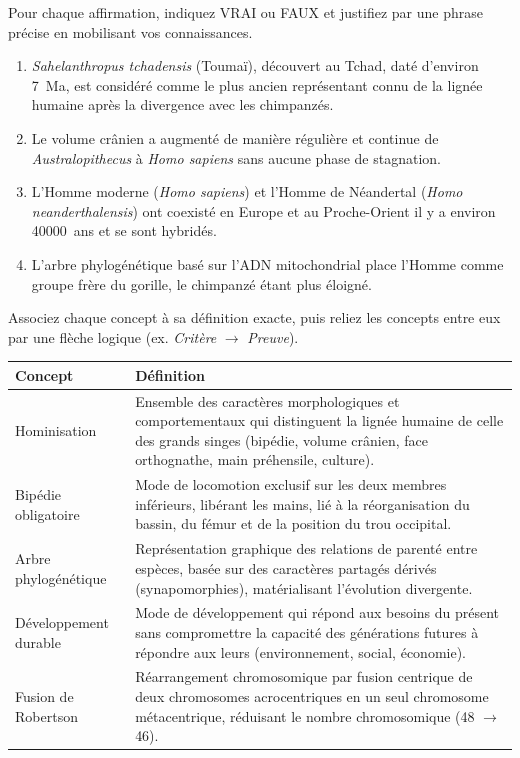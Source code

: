 \documentclass[11pt]{article}
\begin{document}
\begin{exercice}
Pour chaque affirmation, indiquez VRAI ou FAUX et justifiez par une phrase précise en mobilisant vos connaissances.
\begin{enumerate}
    \item \emph{Sahelanthropus tchadensis} (Toumaï), découvert au Tchad, daté d'environ \SI{7}{Ma}, est considéré comme le plus ancien représentant connu de la lignée humaine après la divergence avec les chimpanzés.
    \item Le volume crânien a augmenté de manière régulière et continue de \emph{Australopithecus} à \emph{Homo sapiens} sans aucune phase de stagnation.
    \item L'Homme moderne (\emph{Homo sapiens}) et l'Homme de Néandertal (\emph{Homo neanderthalensis}) ont coexisté en Europe et au Proche-Orient il y a environ \SI{40000}{ans} et se sont hybridés.
    \item L'arbre phylogénétique basé sur l'ADN mitochondrial place l'Homme comme groupe frère du gorille, le chimpanzé étant plus éloigné.
\end{enumerate}
\end{exercice}

\begin{exercice}
Associez chaque concept à sa définition exacte, puis reliez les concepts entre eux par une flèche logique (ex. \emph{Critère} $\rightarrow$ \emph{Preuve}).
\begin{center}
\begin{tabularx}{\linewidth}{|l|X|}\hline
\textbf{Concept} & \textbf{Définition} \\ \hline
Hominisation & Ensemble des caractères morphologiques et comportementaux qui distinguent la lignée humaine de celle des grands singes (bipédie, volume crânien, face orthognathe, main préhensile, culture). \\ \hline
Bipédie obligatoire & Mode de locomotion exclusif sur les deux membres inférieurs, libérant les mains, lié à la réorganisation du bassin, du fémur et de la position du trou occipital. \\ \hline
Arbre phylogénétique & Représentation graphique des relations de parenté entre espèces, basée sur des caractères partagés dérivés (synapomorphies), matérialisant l'évolution divergente. \\ \hline
Développement durable & Mode de développement qui répond aux besoins du présent sans compromettre la capacité des générations futures à répondre aux leurs (environnement, social, économie). \\ \hline
Fusion de Robertson & Réarrangement chromosomique par fusion centrique de deux chromosomes acrocentriques en un seul chromosome métacentrique, réduisant le nombre chromosomique (48 $\rightarrow$ 46). \\ \hline
\end{tabularx}
\end{center}
\end{exercice}
\end{document}
